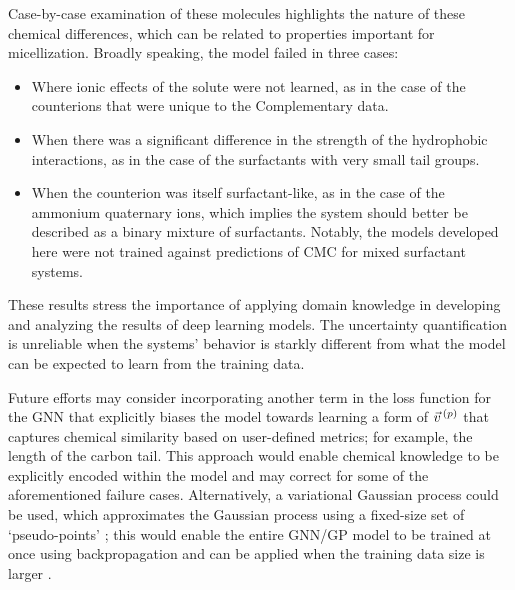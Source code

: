 Case-by-case examination of these molecules highlights the nature of these
chemical differences, which can be related to properties important for
micellization. Broadly speaking, the model failed in three cases:
\begin{itemize}
    \item Where ionic effects of the solute were not learned, as in the case of the counterions that were unique to the Complementary data.
    \item When there was a significant difference in the strength of the
          hydrophobic interactions, as in the case of the surfactants with very small
          tail groups.
    \item When the counterion was itself surfactant-like, as in the case of the
          ammonium quaternary ions, which implies the system should better be
          described as a binary mixture of surfactants. Notably, the models
          developed here were not trained against predictions of CMC for mixed
          surfactant systems.
\end{itemize}
These results stress the importance of applying domain knowledge in developing
and analyzing the results of deep learning models. The uncertainty
quantification is unreliable when the systems' behavior is starkly different
from what the model can be expected to learn from the training data.

Future efforts may consider incorporating another term in the loss function for
the GNN that explicitly biases the model towards learning a form of $\vec{v}^{\,(p)}{}$
that captures chemical similarity based on user-defined metrics; for example,
the length of the carbon tail. This approach would enable chemical knowledge to
be explicitly encoded within the model and may correct for some of the
aforementioned failure cases. Alternatively, a variational Gaussian process
could be used, which approximates the Gaussian process using a fixed-size set of
`pseudo-points' \cite{hensmanGaussianProcessesBig2013}; this would enable the
entire GNN/GP model to be trained at once using backpropagation and can be
applied when the training data size is larger
\cite{moriartyUnlockNNUncertaintyQuantification2022}.